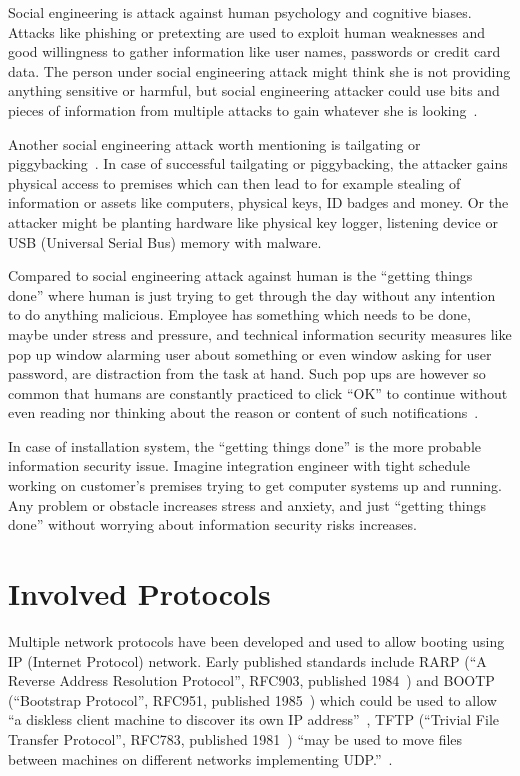 Social engineering is attack against human psychology and cognitive
biases. Attacks like phishing or pretexting are used to exploit human
weaknesses and good willingness to gather information like user names,
passwords or credit card data. The person under social engineering
attack might think she is not providing anything sensitive or harmful,
but social engineering attacker could use bits and pieces of
information from multiple attacks to gain whatever she is
looking~\cite{greavu2014social}\cite{anderson}.

Another social engineering attack worth mentioning is tailgating or
piggybacking~\cite{fairbrother2014insider}. In case of successful
tailgating or piggybacking, the attacker gains physical access to
premises which can then lead to for example stealing of information or
assets like computers, physical keys, ID badges and money. Or the
attacker might be planting hardware like physical key logger, listening
device or USB (Universal Serial Bus) memory with malware.

Compared to social engineering attack against human is the ``getting
things done'' where human is just trying to get through the day
without any intention to do anything malicious. Employee has something
which needs to be done, maybe under stress and pressure, and technical
information security measures like pop up window alarming user about
something or even window asking for user password, are distraction
from the task at hand. Such pop ups are however so common that humans
are constantly practiced to click ``OK'' to continue without even
reading nor thinking about the reason or content of such
notifications~\cite{anderson}.

In case of installation system, the ``getting things done'' is the
more probable information security issue. Imagine integration engineer
with tight schedule working on customer's premises trying to get
computer systems up and running. Any problem or obstacle increases
stress and anxiety, and just ``getting things done'' without worrying
about information security risks increases.


\section{Involved Protocols}


Multiple network protocols have been developed and used to allow
booting using IP (Internet Protocol) network. Early published
standards include RARP (``A Reverse Address Resolution Protocol'',
RFC903, published 1984~\cite{RFC903}) and BOOTP (``Bootstrap
Protocol'', RFC951, published 1985~\cite{RFC951}) which could be used
to allow ``a diskless client machine to discover its own IP
address''~\cite{RFC951}, TFTP (``Trivial File Transfer Protocol'',
RFC783, published 1981~\cite{RFC783}) ``may be used to move files
between machines on different networks implementing
UDP.''~\cite{RFC783}.


